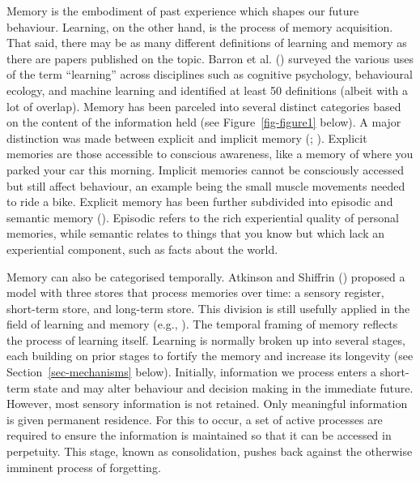 \documentclass[
  jou,
  floatsintext,
  longtable,
  nolmodern,
  notxfonts,
  notimes,
  donotrepeattitle,
  colorlinks=true,linkcolor=blue,citecolor=blue,urlcolor=blue]{apa7}
\begin{document}
Memory is the embodiment of past experience which shapes our future
behaviour. Learning, on the other hand, is the process of memory
acquisition. That said, there may be as many different definitions of
learning and memory as there are papers published on the topic. Barron
et al. () surveyed the various
uses of the term ``learning'' across disciplines such as cognitive
psychology, behavioural ecology, and machine learning and identified at
least 50 definitions (albeit with a lot of overlap). Memory has been
parceled into several distinct categories based on the content of the
information held (see Figure~\ref{fig-figure1} below). A major
distinction was made between explicit and implicit memory
(;
). Explicit memories are
those accessible to conscious awareness, like a memory of where you
parked your car this morning. Implicit memories cannot be consciously
accessed but still affect behaviour, an example being the small muscle
movements needed to ride a bike. Explicit memory has been further
subdivided into episodic and semantic memory
(). Episodic refers
to the rich experiential quality of personal memories, while semantic
relates to things that you know but which lack an experiential
component, such as facts about the world.

Memory can also be categorised temporally. Atkinson and Shiffrin
() proposed a model with three
stores that process memories over time: a sensory register, short-term
store, and long-term store. This division is still usefully applied in
the field of learning and memory (e.g.,
).
The temporal framing of memory reflects the process of learning itself.
Learning is normally broken up into several stages, each building on
prior stages to fortify the memory and increase its longevity (see
Section~\ref{sec-mechanisms} below). Initially, information we process
enters a short-term state and may alter behaviour and decision making in
the immediate future. However, most sensory information is not retained.
Only meaningful information is given permanent residence. For this to
occur, a set of active processes are required to ensure the information
is maintained so that it can be accessed in perpetuity. This stage,
known as consolidation, pushes back against the otherwise imminent
process of forgetting.
\end{document}
